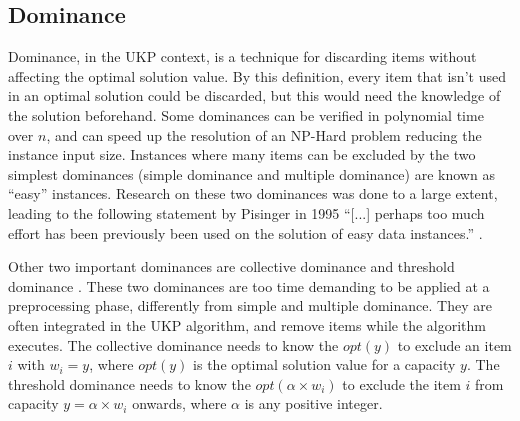 \documentclass[runningheads,a4paper]{llncs}
\begin{document}

\subsection{Dominance}

Dominance, in the UKP context, is a technique for discarding items without affecting the optimal solution value. 
By this definition, every item that isn't used in an optimal solution could be discarded, but this would need the knowledge of the solution beforehand. 
Some dominances can be verified in polynomial time over \(n\), and can speed up the resolution of an NP-Hard problem reducing the instance input size. 
Instances where many items can be excluded by the two simplest dominances (simple dominance and multiple dominance) are known as ``easy'' instances. 
Research on these two dominances was done to a large extent, leading to the following statement by Pisinger in 1995
``[...] perhaps too much effort has been previously been used on the solution of easy data instances.'' \cite[p. 20]{pisinger1995}.

Other two important dominances are collective dominance and threshold dominance \cite{pya}. 
These two dominances are too time demanding to be applied at a preprocessing phase, differently from simple and multiple dominance. 
They are often integrated in the UKP algorithm, and remove items while the algorithm executes. 
The collective dominance needs to know the \(opt(y)\) to exclude an item \(i\) with \(w_i = y\), where \(opt(y)\) is the optimal solution value for a capacity $y$.
The threshold dominance needs to know the \(opt(\alpha\times w_i)\) to exclude the item \(i\) from capacity \(y = \alpha\times w_i\) onwards, where \(\alpha\) is any positive integer.

\end{document}

